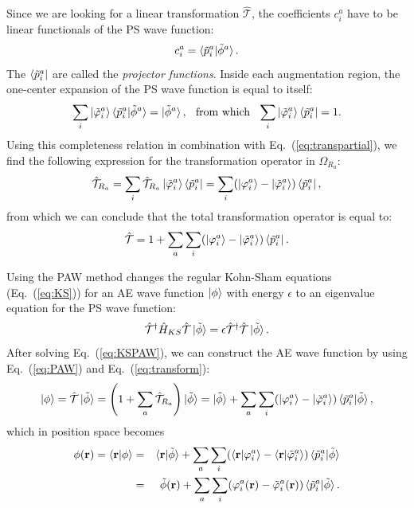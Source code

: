 \begin{refsection}
Since we are looking for a linear transformation $\hat{\mathcal{T}}$, the coefficients $c_i^a$ have to be linear functionals of the PS wave function:
\begin{equation}
c_i^a = \braket{\tilde{p}_i^a | \tilde{\phi}^a}.
\end{equation}
The $\bra{\tilde{p}_i^a}$ are called the \textit{projector functions}. Inside each augmentation region, the one-center expansion of the PS wave function is equal to itself:
\begin{equation}
\sum_i \ket{\tilde{\varphi}_i^a}\braket{\tilde{p}_i^a | \tilde{\phi}^a} = \ket{\tilde{\phi}^a},\hspace{0.1in}\text{from which} \hspace{0.1in} \sum_i \ket{\tilde{\varphi}_i^a}\bra{\tilde{p}_i^a} = 1. 
\end{equation}
Using this completeness relation in combination with Eq.~(\ref{eq:transpartial}), we find the following expression for the transformation operator in $\Omega_{R_a}$:
\begin{equation}
\hat{\mathcal{T}}_{R_a} = \sum_i \hat{\mathcal{T}}_{R_a} \ket{\tilde{\varphi}_i^a}\bra{\tilde{p}_i^a} = \sum_i(\ket{\varphi_i^a} - \ket{\tilde{\varphi}_i^a})\bra{\tilde{p}_i^a},
\end{equation}
from which we can conclude that the total transformation operator is equal to:
\begin{equation}\label{eq:transform}
\hat{\mathcal{T}} = 1 + \sum_a \sum_i(\ket{\varphi_i^a} - \ket{\tilde{\varphi}_i^a})\bra{\tilde{p}_i^a}.
\end{equation}

Using the PAW method changes the regular Kohn-Sham equations (Eq.~(\ref{eq:KS})) for an AE wave function $\ket{\phi}$ with energy $\epsilon$ to an eigenvalue equation for the PS wave function:
\begin{equation}\label{eq:KSPAW}
\hat{\mathcal{T}}^\dagger \hat{H}_{KS} \hat{\mathcal{T}} \ket{\tilde{\phi}} = \epsilon \hat{\mathcal{T}}^\dagger \hat{\mathcal{T}} \ket{\tilde{\phi}}.
\end{equation}
After solving Eq.~(\ref{eq:KSPAW}), we can construct the AE wave function by using Eq.~(\ref{eq:PAW}) and Eq.~(\ref{eq:transform}):
\begin{equation}
\ket{\phi} = \hat{\mathcal{T}} \ket{\tilde{\phi}} = \left(1 + \sum_a \hat{\mathcal{T}}_{R_a}\right) \ket{\tilde{\phi}}= \ket{\tilde{\phi}} + \sum_a \sum_i(\ket{\varphi_i^a} - \ket{\tilde{\varphi}_i^a})\braket{\tilde{p}_i^a | \tilde{\phi}},
\end{equation}
which in position space becomes
\begin{eqnarray}
\phi(\mathbf{r}) = \braket{\mathbf{r} | \phi} &=& \braket{\mathbf{r} |\tilde{\phi}} + \sum_a \sum_i(\braket{\mathbf{r} | \varphi_i^a} - \braket{\mathbf{r} | \tilde{\varphi}_i^a})\braket{\tilde{p}_i^a | \tilde{\phi}}
\\&=& \tilde{\phi}(\mathbf{r}) + \sum_a \sum_i(\varphi_i^a(\mathbf{r}) - \tilde{\varphi}_i^a (\mathbf{r}))\braket{\tilde{p}_i^a | \tilde{\phi}}.
\end{eqnarray}


\end{refsection}
